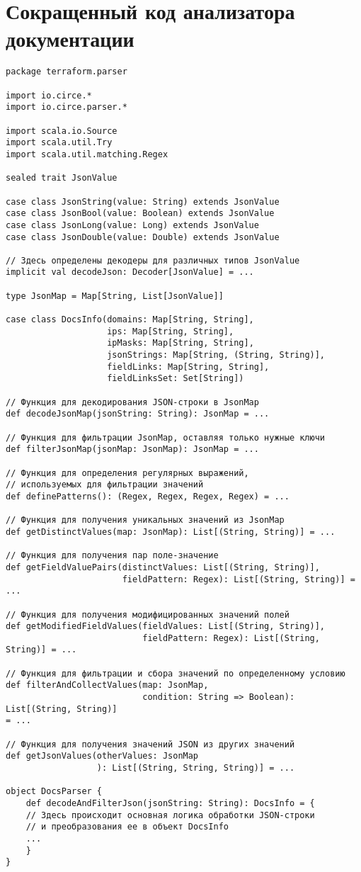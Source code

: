 ﻿\chapter{Сокращенный код анализатора документации}\label{sec:appendix5}

\begin{verbatim}
package terraform.parser

import io.circe.*
import io.circe.parser.*

import scala.io.Source
import scala.util.Try
import scala.util.matching.Regex

sealed trait JsonValue

case class JsonString(value: String) extends JsonValue
case class JsonBool(value: Boolean) extends JsonValue
case class JsonLong(value: Long) extends JsonValue
case class JsonDouble(value: Double) extends JsonValue

// Здесь определены декодеры для различных типов JsonValue
implicit val decodeJson: Decoder[JsonValue] = ...

type JsonMap = Map[String, List[JsonValue]]

case class DocsInfo(domains: Map[String, String],
                    ips: Map[String, String],
                    ipMasks: Map[String, String],
                    jsonStrings: Map[String, (String, String)],
                    fieldLinks: Map[String, String],
                    fieldLinksSet: Set[String])

// Функция для декодирования JSON-строки в JsonMap
def decodeJsonMap(jsonString: String): JsonMap = ...

// Функция для фильтрации JsonMap, оставляя только нужные ключи
def filterJsonMap(jsonMap: JsonMap): JsonMap = ...

// Функция для определения регулярных выражений,
// используемых для фильтрации значений
def definePatterns(): (Regex, Regex, Regex, Regex) = ...

// Функция для получения уникальных значений из JsonMap
def getDistinctValues(map: JsonMap): List[(String, String)] = ...

// Функция для получения пар поле-значение
def getFieldValuePairs(distinctValues: List[(String, String)],
                       fieldPattern: Regex): List[(String, String)] = ...

// Функция для получения модифицированных значений полей
def getModifiedFieldValues(fieldValues: List[(String, String)],
                           fieldPattern: Regex): List[(String, String)] = ...

// Функция для фильтрации и сбора значений по определенному условию
def filterAndCollectValues(map: JsonMap,
                           condition: String => Boolean): List[(String, String)]
= ...

// Функция для получения значений JSON из других значений
def getJsonValues(otherValues: JsonMap
                  ): List[(String, String, String)] = ...

object DocsParser {
    def decodeAndFilterJson(jsonString: String): DocsInfo = {
    // Здесь происходит основная логика обработки JSON-строки
    // и преобразования ее в объект DocsInfo
    ...
    }
}
\end{verbatim}
